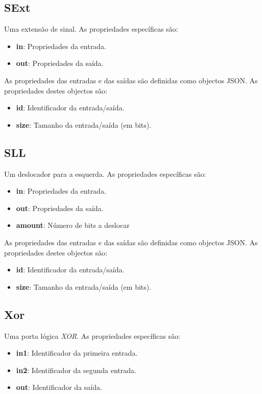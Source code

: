 \documentclass[11pt,a4paper,twoside,titlepage]{report}
\begin{document}
\subsection{SExt}

Uma extensão de sinal. As propriedades específicas são:
\begin{itemize}
	\item \textbf{in}: Propriedades da entrada.
	\item \textbf{out}: Propriedades da saída.
\end{itemize}

As propriedades das entradas e das saídas são definidas como objectos JSON.
As propriedades destes objectos são:
\begin{itemize}
	\item \textbf{id}: Identificador da entrada/saída.
	\item \textbf{size}: Tamanho da entrada/saída (em bits).
\end{itemize}

\subsection{SLL}

Um deslocador para a esquerda. As propriedades específicas são:
\begin{itemize}
	\item \textbf{in}: Propriedades da entrada.
	\item \textbf{out}: Propriedades da saída.
	\item \textbf{amount}: Número de bits a deslocar
\end{itemize}

As propriedades das entradas e das saídas são definidas como objectos JSON.
As propriedades destes objectos são:
\begin{itemize}
	\item \textbf{id}: Identificador da entrada/saída.
	\item \textbf{size}: Tamanho da entrada/saída (em bits).
\end{itemize}

\subsection{Xor}

Uma porta lógica \emph{XOR}. As propriedades específicas são:
\begin{itemize}
	\item \textbf{in1}: Identificador da primeira entrada.
	\item \textbf{in2}: Identificador da segunda entrada.
	\item \textbf{out}: Identificador da saída.
\end{itemize}
\end{document}
